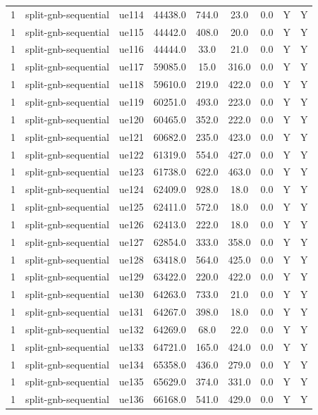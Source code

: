 \begin{table}[ht]
\begin{tabular}{|c|c|c|c|c|c|c|c|c|}
1 & split-gnb-sequential & ue114 & 44438.0 & 744.0 & 23.0 & 0.0 & Y & Y \\
1 & split-gnb-sequential & ue115 & 44442.0 & 408.0 & 20.0 & 0.0 & Y & Y \\
1 & split-gnb-sequential & ue116 & 44444.0 & 33.0 & 21.0 & 0.0 & Y & Y \\
1 & split-gnb-sequential & ue117 & 59085.0 & 15.0 & 316.0 & 0.0 & Y & Y \\
1 & split-gnb-sequential & ue118 & 59610.0 & 219.0 & 422.0 & 0.0 & Y & Y \\
1 & split-gnb-sequential & ue119 & 60251.0 & 493.0 & 223.0 & 0.0 & Y & Y \\
1 & split-gnb-sequential & ue120 & 60465.0 & 352.0 & 222.0 & 0.0 & Y & Y \\
1 & split-gnb-sequential & ue121 & 60682.0 & 235.0 & 423.0 & 0.0 & Y & Y \\
1 & split-gnb-sequential & ue122 & 61319.0 & 554.0 & 427.0 & 0.0 & Y & Y \\
1 & split-gnb-sequential & ue123 & 61738.0 & 622.0 & 463.0 & 0.0 & Y & Y \\
1 & split-gnb-sequential & ue124 & 62409.0 & 928.0 & 18.0 & 0.0 & Y & Y \\
1 & split-gnb-sequential & ue125 & 62411.0 & 572.0 & 18.0 & 0.0 & Y & Y \\
1 & split-gnb-sequential & ue126 & 62413.0 & 222.0 & 18.0 & 0.0 & Y & Y \\
1 & split-gnb-sequential & ue127 & 62854.0 & 333.0 & 358.0 & 0.0 & Y & Y \\
1 & split-gnb-sequential & ue128 & 63418.0 & 564.0 & 425.0 & 0.0 & Y & Y \\
1 & split-gnb-sequential & ue129 & 63422.0 & 220.0 & 422.0 & 0.0 & Y & Y \\
1 & split-gnb-sequential & ue130 & 64263.0 & 733.0 & 21.0 & 0.0 & Y & Y \\
1 & split-gnb-sequential & ue131 & 64267.0 & 398.0 & 18.0 & 0.0 & Y & Y \\
1 & split-gnb-sequential & ue132 & 64269.0 & 68.0 & 22.0 & 0.0 & Y & Y \\
1 & split-gnb-sequential & ue133 & 64721.0 & 165.0 & 424.0 & 0.0 & Y & Y \\
1 & split-gnb-sequential & ue134 & 65358.0 & 436.0 & 279.0 & 0.0 & Y & Y \\
1 & split-gnb-sequential & ue135 & 65629.0 & 374.0 & 331.0 & 0.0 & Y & Y \\
1 & split-gnb-sequential & ue136 & 66168.0 & 541.0 & 429.0 & 0.0 & Y & Y \\

\end{tabular}
\end{table}
